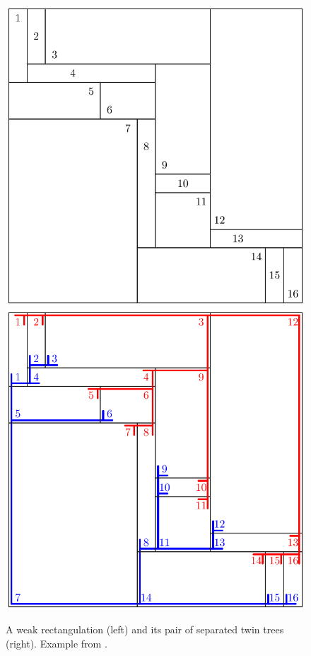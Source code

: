 \documentclass{amsart}
\theoremstyle{definition}
\begin{document}
\begin{figure}
	\centerline{\includegraphics[width=.5\textwidth]{weakRectangulation} \qquad \includegraphics[width=.5\textwidth]{weakRectangulationTrees}}
	\caption{A weak rectangulation (left) and its pair of separated twin trees (right). Example from \cite{ACFF24}.}
	\label{fig:weakRectangulation}
\end{figure}
\end{document}
